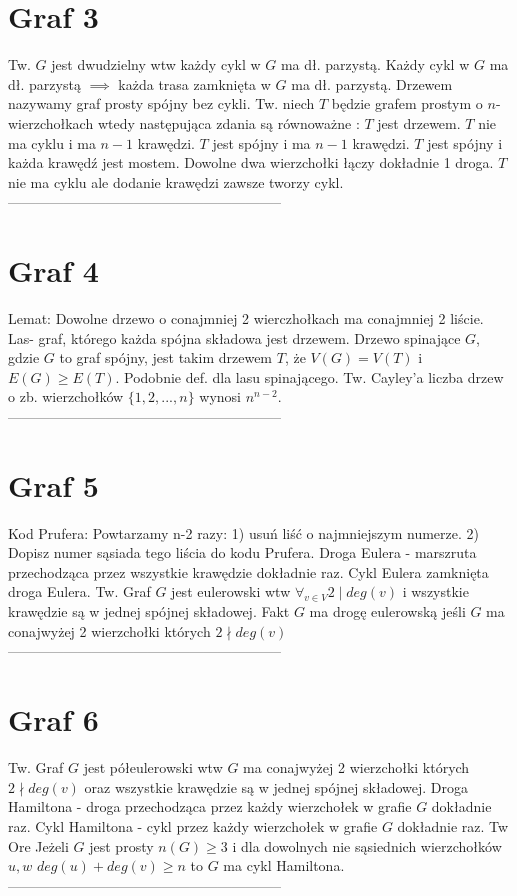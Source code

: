 \documentclass{article}
\begin{document}
\begin{minipage}[t]{.33\textwidth}
\section*{Graf 3}
Tw. $G$ jest dwudzielny wtw każdy cykl w $G$ ma dł. parzystą. Każdy cykl w $G$ ma dł. parzystą  $\implies$ każda trasa zamknięta w $G$ ma dł. parzystą. Drzewem nazywamy graf prosty spójny bez cykli. Tw. niech $T$ będzie grafem prostym o $n$-wierzchołkach wtedy następująca zdania są równoważne : $T$ jest drzewem. $T$ nie ma cyklu i ma $n-1$ krawędzi. $T$ jest spójny  i ma $n-1$ krawędzi. $T$ jest spójny i każda krawędź jest mostem. Dowolne dwa wierzchołki łączy dokładnie 1 droga. $T$ nie ma cyklu ale dodanie krawędzi zawsze tworzy cykl.
\\-----------------------------------------------------------
\section*{Graf 4}
Lemat: Dowolne drzewo o conajmniej 2 wierczhołkach ma conajmniej 2 liście. Las- graf, którego każda spójna składowa jest drzewem. Drzewo spinające $G$, gdzie $G$ to graf spójny, jest takim drzewem $T$, że $V(G) = V(T)$ i $E(G) \geq E(T)$. Podobnie def. dla lasu spinającego. Tw. Cayley'a liczba drzew o zb. wierzchołków $\{1,2,...,n\}$ wynosi $n^{n-2}$.
\\-----------------------------------------------------------
\section*{Graf 5}
Kod Prufera: Powtarzamy n-2 razy: 1) usuń liść o najmniejszym numerze. 2) Dopisz numer sąsiada tego liścia do kodu Prufera. Droga Eulera - marszruta przechodząca przez wszystkie krawędzie dokładnie raz. Cykl Eulera zamknięta droga Eulera. Tw. Graf $G$ jest eulerowski wtw $\forall_{v \in V} 2\mid deg(v)$ i wszystkie krawędzie są w jednej spójnej składowej. Fakt $G$ ma drogę eulerowską jeśli $G$ ma conajwyżej 2 wierzchołki których $2 \nmid deg(v)$
\\-----------------------------------------------------------
\section*{Graf 6}
Tw. Graf $G$ jest półeulerowski wtw $G$ ma conajwyżej 2 wierzchołki których $2 \nmid deg(v)$ oraz wszystkie krawędzie są w jednej spójnej składowej. Droga Hamiltona - droga przechodząca przez każdy wierzchołek w grafie $G$ dokładnie raz. Cykl Hamiltona - cykl przez każdy wierzchołek w grafie $G$ dokładnie raz. Tw Ore Jeżeli $G$ jest prosty $n(G) \geq 3$ i dla dowolnych nie sąsiednich wierzchołków $u,w$ $deg(u) + deg(v) \geq n$ to $G$ ma cykl Hamiltona.
\\-----------------------------------------------------------

\end{minipage}
\end{document}
